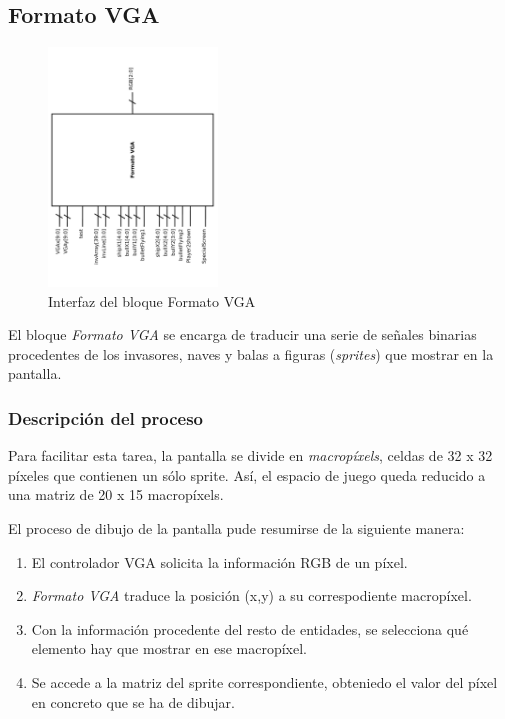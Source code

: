 \subsection{Formato VGA}
\label{formatoVGA}

\begin{figure}[H]
	\centering
	\includegraphics[width=0.4\textwidth, angle=-90] {formatoVGA_block.pdf}
	\caption{Interfaz del bloque Formato VGA}\label{fig:formatoVGA_block}
\end{figure}





El bloque \emph{Formato VGA} se encarga de traducir una serie de señales binarias procedentes de los invasores, naves y balas a figuras (\emph{sprites}) que mostrar en la pantalla.

\subsubsection*{Descripción del proceso}

Para facilitar esta tarea, la pantalla se divide en \emph{macropíxels}, celdas de 32 x 32 píxeles que contienen un sólo sprite. Así, el espacio de juego queda reducido a una matriz de 20 x 15 macropíxels. 

El proceso de dibujo de la pantalla pude resumirse de la siguiente manera:

\begin{enumerate}

\item El controlador VGA solicita la información RGB de un píxel.

\item \emph{Formato VGA} traduce la posición (x,y) a su correspodiente macropíxel.

\item Con la información procedente del resto de entidades, se selecciona qué elemento hay que mostrar en ese macropíxel.

\item Se accede a la matriz del sprite correspondiente, obteniedo el valor del píxel en concreto que se ha de dibujar.
\end{enumerate}


